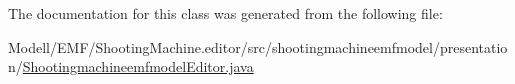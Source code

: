 The documentation for this class was generated from the following file\-:\begin{DoxyCompactItemize}
\item 
Modell/\-E\-M\-F/\-Shooting\-Machine.\-editor/src/shootingmachineemfmodel/presentation/\hyperlink{_shootingmachineemfmodel_editor_8java}{Shootingmachineemfmodel\-Editor.\-java}\end{DoxyCompactItemize}
